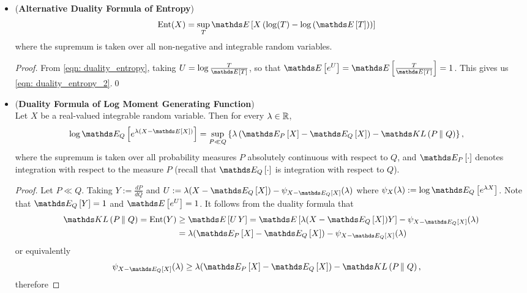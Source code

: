 \documentclass[11pt]{article}
\begin{document}
\begin{itemize}
\item  \begin{theorem}(\textbf{Alternative Duality Formula of Entropy}) \citep{boucheron2013concentration}
\begin{align}
\text{Ent}(X) &= \sup_{T}\E{}{X\paren{\log(T) - \log\paren{\E{}{T}}}}  \label{eqn: duality_entropy_2}
\end{align} where the supremum is taken over all non-negative and integrable random variables.
\end{theorem}
\begin{proof}
From \eqref{eqn: duality_entropy}, taking $U = \log\frac{T}{\E{}{T}}$, so that $\E{}{e^U} = \E{}{\frac{T}{\E{}{T}}} = 1$. This gives us \eqref{eqn: duality_entropy_2}.\qed
\end{proof}

\item \begin{corollary} \label{coro: dual_log_mgf}  (\textbf{Duality Formula of Log Moment Generating Function}) \citep{thomas2006elements, boucheron2013concentration}\\
Let $X$ be a real-valued integrable random variable. Then for every $\lambda \in {\mathbb R}$, 
\begin{align}
\log \E{Q}{e^{\lambda\paren{X - \E{}{X}}}} &= \sup_{P \ll Q}\set{\lambda\paren{\E{P}{X} - \E{Q}{X}} - \kl{P}{Q} }, \label{eqn: duality_log_mgf}
\end{align} where the supremum is taken over all probability measures $P$ absolutely continuous with respect to $Q$, and $\E{P}{\cdot}$ denotes integration with respect to the measure $P$ (recall that $\E{Q}{\cdot}$ is integration with respect to $Q$).
\end{corollary}
\begin{proof}
Let $P \ll Q$. Taking $Y := \frac{dP}{dQ}$ and $U:= \lambda(X - \E{Q}{X}) - \psi_{X- \E{Q}{X}}(\lambda)$ where $\psi_{X}(\lambda) := \log \E{Q}{e^{\lambda X}}$. Note that $\E{Q}{Y} = 1$ and $\E{}{e^{U}} = 1$. It follows from the duality formula that 
\begin{align*}
\kl{P}{Q} = \text{Ent}(Y) &\ge \E{}{U\,Y} = \E{}{\lambda(X - \E{Q}{X})Y} - \psi_{X- \E{Q}{X}}(\lambda)\\
&= \lambda(\E{P}{X} - \E{Q}{X})  - \psi_{X- \E{Q}{X}}(\lambda)
\end{align*} or equivalently
\begin{align*}
\psi_{X- \E{Q}{X}}(\lambda) &\ge \lambda(\E{P}{X} - \E{Q}{X})  - \kl{P}{Q},
\end{align*} therefore

\end{proof}
\end{itemize}
\end{document}
